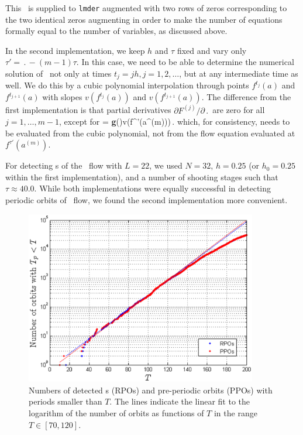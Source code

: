 This \jacobianM\ is supplied to {\tt lmder}
augmented with two rows of zeros corresponding to the two identical
zeros augmenting  in order to make the number of
equations formally equal to the number of variables,
as discussed above.

In the second implementation, we keep $h$ and $\tau$ fixed and vary
only $\tau' = \period{} - (m-1)\tau$.  In this case, we need to be
able to determine the numerical solution of \KSe\ not only at times
$t_j = jh, j = 1, 2, \ldots$, but at any intermediate time as well.
We do this by a cubic polynomial interpolation through points
$f^{t_j}(a)$ and $f^{t_{j+1}}(a)$ with slopes $v(f^{t_j}(a))$ and
$v(f^{t_{j+1}}(a))$.  The difference from the first implementation
is that partial derivatives $\partial F^{(j)}/\partial \period{}$
are zero for all $j = 1,\ldots,m-1$, except for
\beq
   =
  {\bf g}(\shift)v(f^{\tau'}(a^{(m)}))\,.
\eeq
which, for consistency, needs to be evaluated from the cubic
polynomial, not from the flow equation evaluated
at $f^{\tau'}(a^{(m)})$.

For detecting \rpo s of the \KS\ flow with $L = 22$, we used
$N = 32$, $h = 0.25$ (or $h_0 = 0.25$ within the first implementation),
and a number of shooting stages such that $\tau \approx 40.0$.
While both implementations were equally successful in detecting
periodic orbits of \KS\ flow, we found the second implementation more
convenient.


\begin{figure}[t]
\begin{center}
\includegraphics[width=0.9\textwidth, clip=true]{figs_bmp/ks22_Npos_30k.eps}
\end{center}
\caption{
Numbers of detected \rpo s (RPOs) and pre-periodic orbits (PPOs)
with periods smaller than $T$.  The lines indicate the linear fit
to the logarithm of the number of orbits as functions of $T$ in the
range $T \in [70, 120]$.
     } \label{fig:Npos}
\end{figure}

